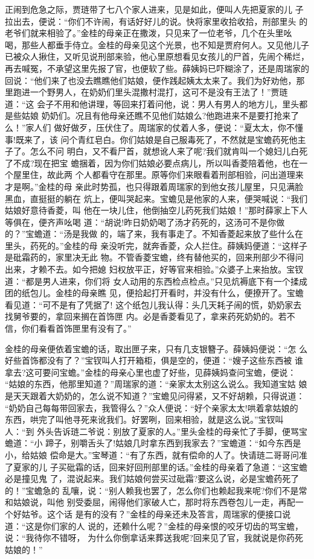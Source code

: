 正闹到危急之际，贾琏带了七八个家人进来，见是如此，便叫人先把夏家的儿
子拉出去，便说：“你们不许闹，有话好好儿的说。快将家里收拾收拾，刑部里头
的老爷们就来相验了。”金桂的母亲正在撒泼，只见来了一位老爷，几个在头里吆
喝，那些人都垂手侍立。金桂的母亲见这个光景，也不知是贾府何人。又见他儿子
已被众人揪住，又听见说刑部来验，他心里原想看见女孩儿的尸首，先闹个稀烂，
再去喊冤，不承望这里先报了官，也便软了些。薛姨妈已吓糊涂了，还是周瑞家的
回说：“他们来了也没去瞧瞧他们姑娘，便作践起姨太太来了。我们为好劝他，那
里跑进一个野男人，在奶奶们里头混撒村混打，这可不是没有王法了！”贾琏道：“这
会子不用和他讲理，等回来打着问他，说：男人有男人的地方儿，里头都是些姑娘
奶奶们。况且有他母亲还瞧不见他们姑娘么?他跑进来不是要打抢来了么！”家人们
做好做歹，压伏住了。周瑞家的仗着人多，便说：“夏太太，你不懂事!既来了，该
问个青红皂白。你们姑娘是自己服毒死了，不然就是宝蟾药死他主子了。怎么不问
明白，又不看尸首，就想讹人来了呢?我们就肯叫一个媳妇儿白死了不成?现在把宝
蟾捆着，因为你们姑娘必要点病儿，所以叫香菱陪着他，也在一个屋里住，故此两
个人都看守在那里。原等你们来眼看着刑部相验，问出道理来才是啊。”金桂的母
亲此时势孤，也只得跟着周瑞家的到他女孩儿屋里，只见满脸黑血，直挺挺的躺在
炕上，便叫哭起来。宝蟾见是他家的人来，便哭喊说：“我们姑娘好意待香菱，叫
他在一块儿住，他倒抽空儿药死我们姑娘！”那时薛家上下人等俱在，便齐声吆喝
道：“胡说!昨日奶奶喝了汤才药死的，这汤可不是你做的？”宝蟾道：“汤是我做
的，端了来，我有事走了。不知香菱起来放了些什么在里头，药死的。”金桂的母
亲没听完，就奔香菱，众人拦住。薛姨妈便道：“这样子是砒霜药的，家里决无此
物。不管香菱宝蟾，终有替他买的，回来刑部少不得问出来，才赖不去。如今把媳
妇权放平正，好等官来相验。”众婆子上来抬放。宝钗道：“都是男人进来，你们将
女人动用的东西检点检点。”只见炕褥底下有一个揉成团的纸包儿。金桂的母亲瞧
见，便拾起打开看时，并没有什么，便撩开了。宝蟾看见道：“可不是有了凭据了!
这个纸包儿我认得：头几天耗子闹的慌，奶奶家去找舅爷要的，拿回来搁在首饰匣
内。必是香菱看见了，拿来药死奶奶的。若不信，你们看看首饰匣里有没有了。”

金桂的母亲便依着宝蟾的话，取出匣子来，只有几支银簪子。薛姨妈便说：“怎
么好些首饰都没有了？”宝钗叫人打开箱柜，俱是空的，便道：“嫂子这些东西被
谁拿去?这可要问宝蟾。”金桂的母亲心里也虚了好些，见薛姨妈查问宝蟾，便说：
“姑娘的东西，他那里知道？”周瑞家的道：“亲家太太别这么说么。我知道宝姑
娘是天天跟着大奶奶的，怎么说不知道？”宝蟾见问得紧，又不好胡赖，只得说道：
“奶奶自己每每带回家去，我管得么？”众人便说：“好个亲家太太!哄着拿姑娘的
东西，哄完了叫他寻死来讹我们。好罢咧，回来相验，就是这么说。”宝钗叫人：“到
外头告诉琏二爷说：别放了夏家的人。”里头金桂的母亲忙了手脚，便骂宝蟾道：“小
蹄子，别嚼舌头了!姑娘几时拿东西到我家去？”宝蟾道：“如今东西是小，给姑娘
偿命是大。”宝琴道：“有了东西，就有偿命的人了。快请琏二哥哥问准了夏家的儿
子买砒霜的话，回来好回刑部里的话。”金桂的母亲着了急道：“这宝蟾必是撞见鬼
了，混说起来。我们姑娘何尝买过砒霜?要这么说，必是宝蟾药死了的！”宝蟾急的
乱嚷，说：“别人赖我也罢了，怎么你们也赖起我来呢?你们不是常和姑娘说，叫他
别受委屈，闹得他们家破人亡，那时将东西卷包儿一走，再配一个好姑爷。这个话
是有的没有？”金桂的母亲还未及答言，周瑞家的便接口说道：“这是你们家的人
说的，还赖什么呢？”金桂的母亲恨的咬牙切齿的骂宝蟾，说：“我待你不错呀，
为什么你倒拿话来葬送我呢?回来见了官，我就说是你药死姑娘的！”

